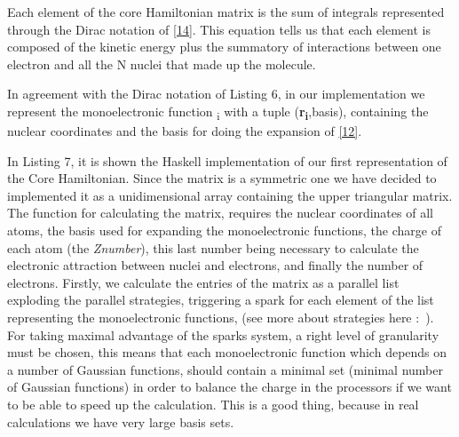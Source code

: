 \documentclass{tmr}
\begin{document}
Each element of the core Hamiltonian matrix is the sum of integrals represented through
the Dirac notation of \eqref{14}. This equation tells us that each element is composed
of the kinetic energy plus the summatory of interactions between one electron and all the N
nuclei that made up the molecule.

In agreement with the Dirac notation of Listing 6, in our implementation we represent the
monoelectronic function \textchi \textsubscript{i} with a tuple 
(\textbf{r\textsubscript{i}},basis), containing the nuclear coordinates 
and the basis for doing the expansion of \eqref{12}.

In Listing 7, it is shown the Haskell implementation of our first representation of 
the Core Hamiltonian. Since the matrix is a symmetric one we have decided to implemented it
as a unidimensional array containing the upper triangular matrix.
The function for calculating the matrix, requires the nuclear coordinates of all atoms, the basis used
for expanding the monoelectronic functions, the charge of each atom (the \textit{Znumber}),
this last number being necessary to calculate the electronic attraction 
between nuclei and electrons, and finally the number of electrons. Firstly, we
calculate the entries of the matrix as a parallel list exploding the parallel strategies,
triggering a spark for each element of the list representing the monoelectronic functions, 
(see more about strategies here :~\cite{strategies}). For taking maximal advantage
of the sparks system, a right level of granularity must be chosen, this means that 
each monoelectronic function which depends on a number of Gaussian functions, should contain
a minimal set (minimal number of Gaussian functions) in order to balance the charge 
in the processors if we want to be able to speed up the calculation.
This is a good thing, because in real calculations we have very large basis sets.
\end{document}
